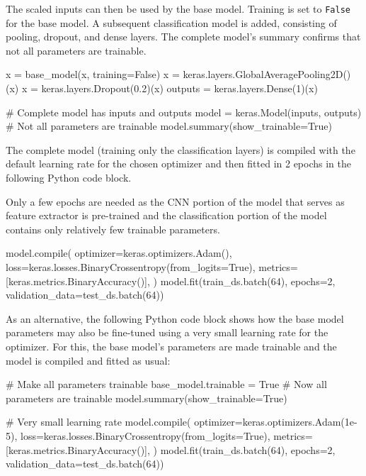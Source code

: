 \begin{withcode}
The scaled inputs can then be used by the base model. Training is set to \texttt{False} for the base model. A subsequent classification model is added, consisting of pooling, dropout, and dense layers. The complete model's summary confirms that not all parameters are trainable.
\begin{pythoncode}
x = base_model(x, training=False)
x = keras.layers.GlobalAveragePooling2D()(x)
x = keras.layers.Dropout(0.2)(x)
outputs = keras.layers.Dense(1)(x)

# Complete model has inputs and outputs
model = keras.Model(inputs, outputs)
# Not all parameters are trainable
model.summary(show_trainable=True)
\end{pythoncode}

The complete model (training only the classification layers) is compiled with the default learning rate for the chosen optimizer and then fitted in 2 epochs in the following Python code block. 

\begin{infobox}Only a few epochs are needed as the CNN portion of the model that serves as feature extractor is pre-trained and the classification portion of the model contains only relatively few trainable parameters.\end{infobox}

\begin{pythoncode}
model.compile(
    optimizer=keras.optimizers.Adam(),
    loss=keras.losses.BinaryCrossentropy(from_logits=True),
    metrics=[keras.metrics.BinaryAccuracy()],
)
model.fit(train_ds.batch(64), epochs=2, 
          validation_data=test_ds.batch(64))
\end{pythoncode}

As an alternative, the following Python code block shows how the base model parameters may also be fine-tuned using a very small learning rate for the optimizer. For this, the base model's parameters are made trainable and the model is compiled and fitted as usual:
\begin{pythoncode}
# Make all parameters trainable
base_model.trainable = True
# Now all parameters are trainable
model.summary(show_trainable=True)

# Very small learning rate
model.compile(
    optimizer=keras.optimizers.Adam(1e-5),
    loss=keras.losses.BinaryCrossentropy(from_logits=True),
    metrics=[keras.metrics.BinaryAccuracy()],
)
model.fit(train_ds.batch(64), epochs=2, 
          validation_data=test_ds.batch(64))
\end{pythoncode}
\end{withcode}


